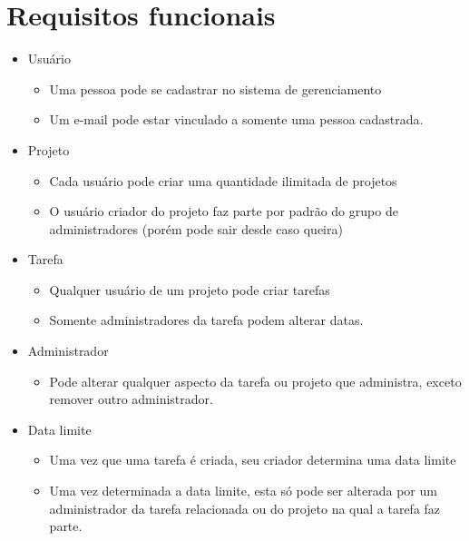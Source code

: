 \documentclass{article}
\begin{document}
\section{Requisitos funcionais}
\begin{itemize}
    \item Usuário
    \begin{itemize}
        \item Uma pessoa pode se cadastrar no sistema de gerenciamento
        \item Um e-mail pode estar vinculado a somente uma pessoa cadastrada.
    \end{itemize}
    \item Projeto
    \begin{itemize}
        \item Cada usuário pode criar uma quantidade ilimitada de projetos
        \item O usuário criador do projeto faz parte por padrão do grupo de administradores (porém pode sair desde caso queira)
    \end{itemize}
    \item Tarefa
    \begin{itemize}
        \item Qualquer usuário de um projeto pode criar tarefas
        \item Somente administradores da tarefa podem alterar datas.
    \end{itemize}
    \item Administrador
    \begin{itemize}
        \item Pode alterar qualquer aspecto da tarefa ou projeto que administra, exceto remover outro administrador.
    \end{itemize}
    \item Data limite
    \begin{itemize}
        \item Uma vez que uma tarefa é criada, seu criador determina uma data limite
        \item Uma vez determinada a data limite, esta só pode ser alterada por um administrador da tarefa relacionada ou do projeto na qual a tarefa faz parte.
    \end{itemize}
\end{itemize}
\end{document}
